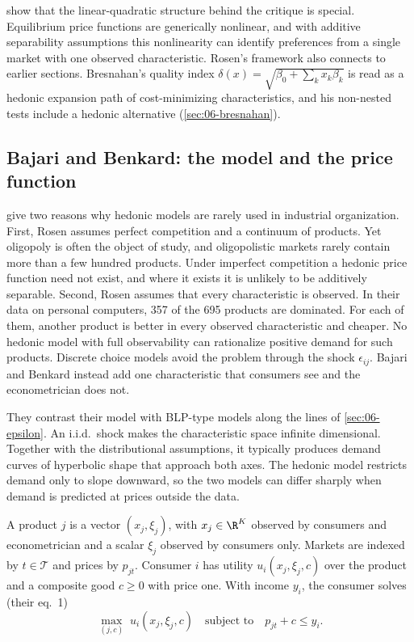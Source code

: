 \citet{EkelandHeckmanNesheim2004} show that the linear-quadratic structure behind the critique is special. Equilibrium
price functions are generically nonlinear, and with additive separability assumptions this nonlinearity can identify
preferences from a single market with one observed characteristic. Rosen's framework also connects to earlier sections.
Bresnahan's quality index $\delta(x) = \sqrt{\beta_0 + \sum_k x_k\beta_k}$ is read as a hedonic expansion path of
cost-minimizing characteristics, and his non-nested tests include a hedonic alternative (\cref{sec:06-bresnahan}).

\subsection{Bajari and Benkard: the model and the price function}\label{sec:06-bb-model}

\citet[pp.~1--5]{BajariBenkard2005} give two reasons why hedonic models are rarely used in industrial organization. First,
Rosen assumes perfect competition and a continuum of products. Yet oligopoly is often the object of study, and oligopolistic
markets rarely contain more than a few hundred products. Under imperfect competition a hedonic price function need not
exist, and where it exists it is unlikely to be additively separable. Second, Rosen assumes that every characteristic is observed. In their data on personal computers,
357 of the 695 products are dominated. For each of them, another product is better in every observed characteristic and
cheaper. No hedonic model with full observability can rationalize positive demand for such products. Discrete choice models
avoid the problem through the shock $\epsilon_{ij}$. Bajari and Benkard instead add one characteristic that consumers see and
the econometrician does not.

They contrast their model with BLP-type models along the lines of \cref{sec:06-epsilon}. An i.i.d.\ shock makes the
characteristic space infinite dimensional. Together with the distributional assumptions, it typically produces demand curves
of hyperbolic shape that approach both axes. The hedonic model restricts demand only to slope downward, so the two models can
differ sharply when demand is predicted at prices outside the data.

A product $j$ is a vector $(x_j, \xi_j)$, with $x_j \in \R^K$ observed by consumers and econometrician and a scalar $\xi_j$
observed by consumers only. Markets are indexed by $t \in \mathcal{T}$ and prices by $p_{jt}$. Consumer $i$ has utility
$u_i(x_j, \xi_j, c)$ over the product and a composite good $c \ge 0$ with price one. With income $y_i$, the consumer solves
(their eq.~1)
\begin{equation}\label{eq:06-bb-consumer}
  \max_{(j, c)}\; u_i(x_j, \xi_j, c) \quad\text{subject to}\quad p_{jt} + c \le y_i .
\end{equation}

